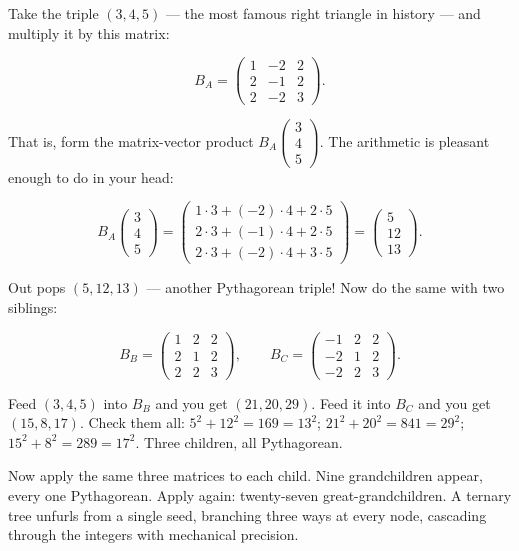 \documentclass[11pt,openany]{book}
\theoremstyle{definition}
\theoremstyle{plain}
\theoremstyle{remark}
\begin{document}
Take the triple $(3, 4, 5)$ — the most famous right triangle in history — and multiply it by this matrix:

$$B_A = \begin{pmatrix} 1 & -2 & 2 \\ 2 & -1 & 2 \\ 2 & -2 & 3 \end{pmatrix}.$$

That is, form the matrix-vector product $B_A \begin{pmatrix} 3 \\ 4 \\ 5 \end{pmatrix}$. The arithmetic is pleasant enough to do in your head:

$$B_A \begin{pmatrix} 3 \\ 4 \\ 5 \end{pmatrix} = \begin{pmatrix} 1\cdot3 + (-2)\cdot4 + 2\cdot5 \\ 2\cdot3 + (-1)\cdot4 + 2\cdot5 \\ 2\cdot3 + (-2)\cdot4 + 3\cdot5 \end{pmatrix} = \begin{pmatrix} 5 \\ 12 \\ 13 \end{pmatrix}.$$

Out pops $(5, 12, 13)$ — another Pythagorean triple! Now do the same with two siblings:

$$B_B = \begin{pmatrix} 1 & 2 & 2 \\ 2 & 1 & 2 \\ 2 & 2 & 3 \end{pmatrix}, \qquad B_C = \begin{pmatrix} -1 & 2 & 2 \\ -2 & 1 & 2 \\ -2 & 2 & 3 \end{pmatrix}.$$

Feed $(3, 4, 5)$ into $B_B$ and you get $(21, 20, 29)$. Feed it into $B_C$ and you get $(15, 8, 17)$. Check them all: $5^2 + 12^2 = 169 = 13^2$; $21^2 + 20^2 = 841 = 29^2$; $15^2 + 8^2 = 289 = 17^2$. Three children, all Pythagorean.

Now apply the same three matrices to each child. Nine grandchildren appear, every one Pythagorean. Apply again: twenty-seven great-grandchildren. A ternary tree unfurls from a single seed, branching three ways at every node, cascading through the integers with mechanical precision.
\end{document}
